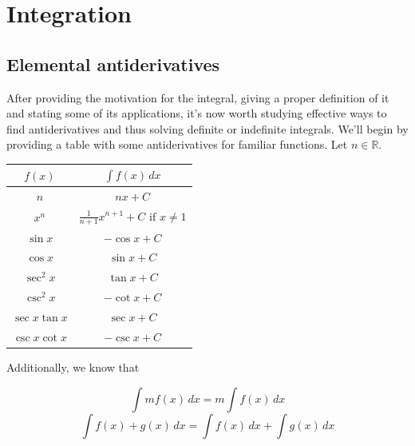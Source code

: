\documentclass{report}
\begin{document}
    \tableofcontents

    \pagebreak
    \chapter{ Integration }

    \section{Elemental antiderivatives}

    After providing the motivation for the integral, giving a proper definition of it and stating some of its applications, it's now worth studying effective ways to find antiderivatives and thus solving definite or indefinite integrals. We'll begin by providing a table with some antiderivatives for familiar functions. Let $n \in \mathbb{R}$.

    \begin{table}[H]
        \setlength{\extrarowheight}{10pt}
        \centering
        \begin{tabular}{|c|c|}
        \hline
        $f(x)$          & $\int f(x) \, dx$           \\ \hline
        $n$             & $nx+C$                      \\ \hline
        $x^n$           & $\frac{1}{n+1}x^{n+1} + C \text{ if } x \not = 1$ \\ \hline
        $\sin x$        & $-\cos x + C$               \\ \hline
        $\cos x$        & $\sin x + C$                \\ \hline
        $\sec^2x$       & $\tan x + C$                \\ \hline
        $\csc^2x$       & $-\cot x +C$                \\ \hline
        $\sec x \tan x$ & $\sec x +C$                 \\ \hline
        $\csc x \cot x$ & $-\csc x +C$                \\ \hline
        \end{tabular}%
    \end{table}

    Additionally, we know that

    $$\int mf(x) \,dx = m\int f(x) \,dx$$
    $$\int f(x) + g(x) \,dx = \int f(x) \,dx + \int g(x) \,dx$$
\end{document}
